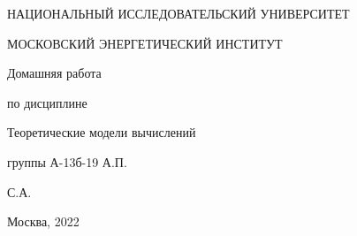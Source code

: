 \documentclass{article}
\begin{document}
    \begin{titlepage}

        \thispagestyle{empty}

        \centerline{НАЦИОНАЛЬНЫЙ ИССЛЕДОВАТЕЛЬСКИЙ УНИВЕРСИТЕТ}
        \centerline{МОСКОВСКИЙ ЭНЕРГЕТИЧЕСКИЙ ИНСТИТУТ}

        \vfill

        \centerline{\huge{Домашняя работа}}
        \centerline{\large{по дисциплине}}
        \centerline{\LARGE{Теоретические модели вычислений}}

        \vfill

         группы А-13б-19 \hfill {} А.П.

         \hfill {} С.А.

        \vfill

        \centerline{Москва, 2022}
        \clearpage
    \end{titlepage}
\end{document}
